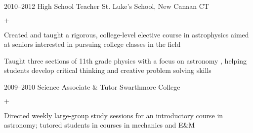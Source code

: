 \documentclass[]{luger-cv} %
\begin{document}
\begin{entrylist}
\fi


\entry
{2010--2012}
{High School Teacher}
{St. Luke's School, New Canaan CT}
{%
\vspace{-1em}
\begin{list}{$+$}{\cvlist}
\item Created and taught a rigorous, college-level elective course in astrophysics
aimed at seniors interested in pursuing college classes in the field
\item Taught three sections of 11th grade physics with a focus on
astronomy
\ifdefined \onepage \else
, helping students develop critical thinking and creative
problem solving skills
\fi
\end{list}
}

%

\ifdefined \onepage \else
\entry
{2009--2010}
{Science Associate \& Tutor}
{Swarthmore College}
{%
\vspace{-1em}
\begin{list}{$+$}{\cvlist}
\item Directed weekly large-group study sessions for an introductory course in
astronomy; tutored students in courses in mechanics and E\&M
\end{list}
}
\fi


\end{entrylist}


\ifdefined \onepage \else
{}
\fi


\end{document}

